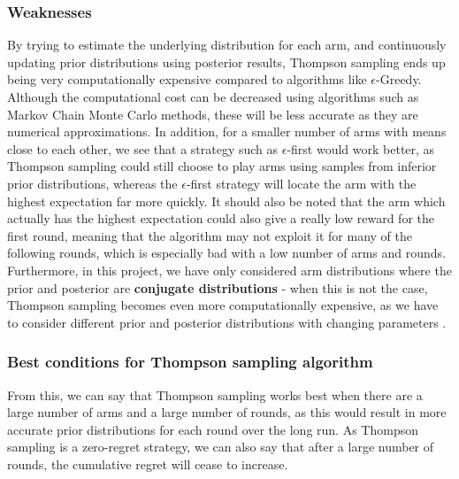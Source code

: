 \subsubsection{Weaknesses}
By trying to estimate the underlying distribution for each arm, and continuously updating prior distributions using posterior results, Thompson sampling ends up being very computationally expensive compared to algorithms like $\epsilon$-Greedy. \citep{mazumdar2020thompson} Although the computational cost can be decreased using algorithms such as Markov Chain Monte Carlo methods, these will be less accurate as they are numerical approximations. \citep{mazumdar2020thompson} In addition, for a smaller number of arms with means close to each other, we see that a strategy such as $\epsilon$-first would work better, as Thompson sampling could still choose to play arms using samples from inferior prior distributions, whereas the $\epsilon$-first strategy will locate the arm with the highest expectation far more quickly. It should also be noted that the arm which actually has the highest expectation could also give a really low reward for the first round, meaning that the algorithm may not exploit it for many of the following rounds, which is especially bad with a low number of arms and rounds. Furthermore, in this project, we have only considered arm distributions where the prior and posterior are \textbf{conjugate distributions} - when this is not the case, Thompson sampling becomes even more computationally expensive, as we have to consider different prior and posterior distributions with changing parameters \citep{zhou2018racing}.

\subsubsection{Best conditions for Thompson sampling algorithm}
From this, we can say that Thompson sampling works best when there are a large number of arms and a large number of rounds, as this would result in more accurate prior distributions for each round over the long run. As Thompson sampling is a zero-regret strategy, we can also say that after a large number of rounds, the cumulative regret will cease to increase. 

